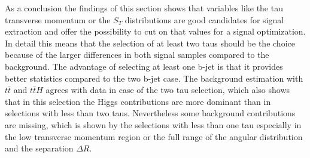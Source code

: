 %
As a conclusion the findings of this section shows that variables like the tau transverse momentum or the $S_T$ distributions are good candidates for signal extraction and offer the possibility to cut on that values for a signal optimization. In detail this means that the selection of at least two taus should be the choice because of the larger differences in both signal samples compared to the background. The advantage of selecting at least one b-jet is that it provides better statistics compared to the two b-jet case. The background estimation with $t\bar{t}$ and $t\bar{t}H$ agrees with data in case of the two tau selection, which also shows that in this selection the Higgs contributions are more dominant than in selections with less than two taus. Nevertheless some background contributions are missing, which is shown by the selections with less than one tau especially in the low transverse momentum region or the full range of the angular distribution and the separation $\Delta R$.  
